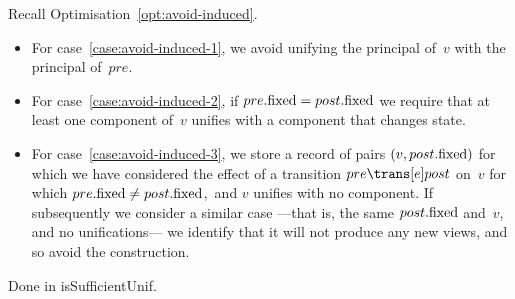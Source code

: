 \begin{opt}
Recall Optimisation~\ref{opt:avoid-induced}.  
\begin{itemize}
\item For case~\ref{case:avoid-induced-1}, we avoid unifying the principal
  of~$v$ with the principal of~$pre$.

\item For case~\ref{case:avoid-induced-2}, if $pre.\mathrm{fixed} = post.\mathrm{fixed}$ we
  require that at least one component of~$v$ unifies with a component that
  changes state.

\item For case~\ref{case:avoid-induced-3}, we store a record of pairs
  $(v, post.\mathrm{fixed})$ for which we have considered the effect of a transition
  $pre \trans[e] post$ on~$v$ for which $pre.\mathrm{fixed} \ne post.\mathrm{fixed}$,\,
  and $v$
  unifies with no component.
%
  If subsequently we consider a similar case ---that is, the same
  $post.\mathrm{fixed}$ and~$v$, and no unifications--- we identify that it will not
  produce any new views, and so avoid the construction.
\end{itemize}
\end{opt}


\begin{impNote}
Done in isSufficientUnif. 
\end{impNote}

